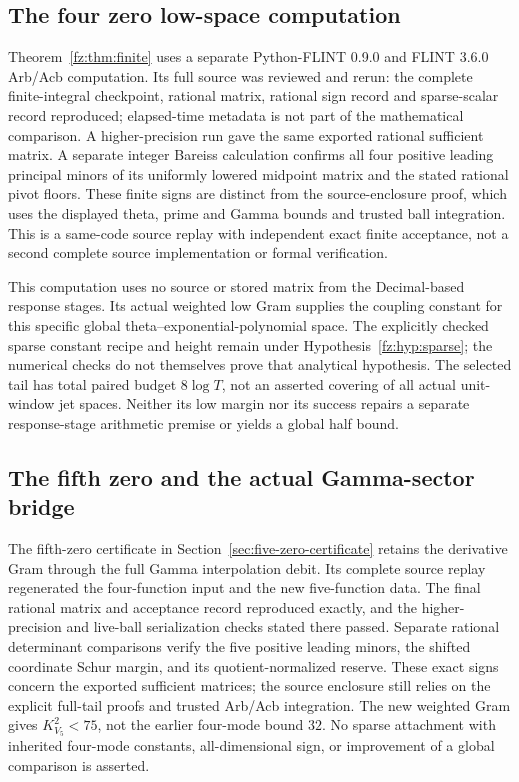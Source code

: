 \documentclass[11pt,a4paper]{article}
\numberwithin{equation}{section}
\theoremstyle{definition}\newtheorem{definition}[theorem]{Definition}
\theoremstyle{remark}\newtheorem{remark}[theorem]{Remark}
\begin{document}
\subsection{The four zero low-space computation}\label{app:four-zero-evidence}
Theorem~\ref{fz:thm:finite} uses a separate Python-FLINT 0.9.0 and
FLINT 3.6.0 Arb/Acb computation. Its full source was reviewed and rerun:
the complete finite-integral checkpoint, rational matrix, rational sign
record and sparse-scalar record reproduced; elapsed-time metadata is not
part of the mathematical comparison. A higher-precision run gave the
same exported rational sufficient matrix. A separate integer Bareiss
calculation confirms all four positive leading principal minors of its
uniformly lowered midpoint matrix and the stated rational pivot floors.
These finite signs are distinct from the source-enclosure proof, which
uses the displayed theta, prime and Gamma bounds and trusted ball
integration. This is a same-code source replay with independent exact
finite acceptance, not a second complete source implementation or formal
verification.

This computation uses no source or stored matrix from the Decimal-based
response stages. Its actual weighted low Gram supplies the coupling
constant for this specific global theta--exponential-polynomial space.
The explicitly checked sparse constant recipe and height remain under
Hypothesis~\ref{fz:hyp:sparse}; the numerical checks do not themselves
prove that analytical hypothesis. The selected tail has total paired
budget $8\log T$, not an asserted covering of all actual unit-window jet
spaces. Neither its low margin nor its success repairs a separate
response-stage arithmetic premise or yields a global half bound.


\subsection{The fifth zero and the actual Gamma-sector bridge}
\label{app:five-gamma-evidence}
The fifth-zero certificate in Section~\ref{sec:five-zero-certificate}
retains the derivative Gram through the full Gamma interpolation debit.
Its complete source replay regenerated the four-function input and the
new five-function data. The final rational matrix and acceptance record
reproduced exactly, and the higher-precision and live-ball serialization
checks stated there passed. Separate rational determinant comparisons
verify the five positive leading minors, the shifted coordinate Schur
margin, and its quotient-normalized reserve. These exact signs concern
the exported sufficient matrices; the source enclosure still relies on
the explicit full-tail proofs and trusted Arb/Acb integration. The new
weighted Gram gives $K_{V_5}^2<75$, not the earlier four-mode bound $32$.
No sparse attachment with inherited four-mode constants, all-dimensional
sign, or improvement of a global comparison is asserted.
\end{document}
